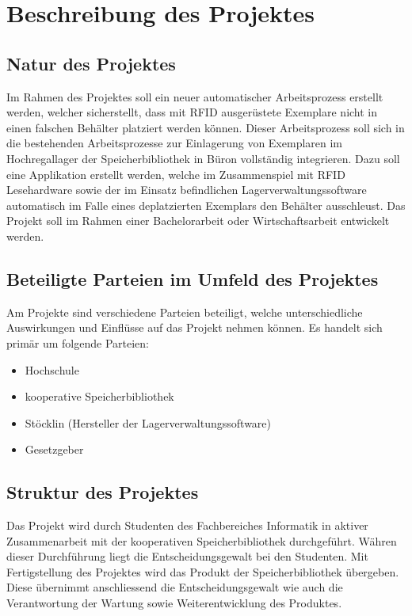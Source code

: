 \chapter{Beschreibung des Projektes}

\section{Natur des Projektes}
Im Rahmen des Projektes soll ein neuer automatischer Arbeitsprozess erstellt werden, welcher sicherstellt, dass mit RFID ausgerüstete Exemplare nicht in einen falschen Behälter platziert werden können. Dieser Arbeitsprozess soll sich in die bestehenden Arbeitsprozesse zur Einlagerung von Exemplaren im Hochregallager der Speicherbibliothek in Büron vollständig integrieren. Dazu soll eine Applikation erstellt werden, welche im Zusammenspiel mit RFID Lesehardware sowie der im Einsatz befindlichen Lagerverwaltungssoftware automatisch im Falle eines deplatzierten Exemplars den Behälter ausschleust. Das Projekt soll im Rahmen einer Bachelorarbeit oder Wirtschaftsarbeit entwickelt werden.

\section{Beteiligte Parteien im Umfeld des Projektes}
Am Projekte sind verschiedene Parteien beteiligt, welche unterschiedliche Auswirkungen und Einflüsse auf das Projekt nehmen können. Es handelt sich primär um folgende Parteien:
\begin{itemize}
	\item Hochschule
	\item kooperative Speicherbibliothek
	\item Stöcklin (Hersteller der Lagerverwaltungssoftware)
	\item Gesetzgeber
\end{itemize}

\section{Struktur des Projektes}
Das Projekt wird durch Studenten des Fachbereiches Informatik in aktiver Zusammenarbeit mit der kooperativen Speicherbibliothek durchgeführt. Währen dieser Durchführung liegt die Entscheidungsgewalt bei den Studenten. Mit Fertigstellung des Projektes wird das Produkt der Speicherbibliothek übergeben. Diese übernimmt anschliessend die Entscheidungsgewalt wie auch die Verantwortung der Wartung sowie Weiterentwicklung des Produktes.

